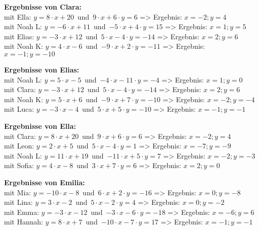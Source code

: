 \begin{minipage}{\textwidth}
\textbf{Ergebnisse von Clara:}\\
mit Ella: $y=8\cdot x+20$\mbox{ }und\mbox{ }$9\cdot x+6\cdot y=6$ => Ergebnis: $x=-2;y=4$
\\
mit Noah L: $y=-6\cdot x+11$\mbox{ }und\mbox{ }$-5\cdot x+4\cdot y=15$ => Ergebnis: $x=1;y=5$
\\
mit Elias: $y=-3\cdot x+12$\mbox{ }und\mbox{ }$5\cdot x-4\cdot y=-14$ => Ergebnis: $x=2;y=6$
\\
mit Noah K: $y=4\cdot x-6$\mbox{ }und\mbox{ }$-9\cdot x+2\cdot y=-11$ => Ergebnis: $x=-1;y=-10$
\\
\end{minipage}
\vspace*{3ex}

\begin{minipage}{\textwidth}
\textbf{Ergebnisse von Elias:}\\
mit Noah L: $y=5\cdot x-5$\mbox{ }und\mbox{ }$-4\cdot x-11\cdot y=-4$ => Ergebnis: $x=1;y=0$
\\
mit Clara: $y=-3\cdot x+12$\mbox{ }und\mbox{ }$5\cdot x-4\cdot y=-14$ => Ergebnis: $x=2;y=6$
\\
mit Noah K: $y=5\cdot x+6$\mbox{ }und\mbox{ }$-9\cdot x+7\cdot y=-10$ => Ergebnis: $x=-2;y=-4$
\\
mit Luca: $y=-3\cdot x-4$\mbox{ }und\mbox{ }$5\cdot x+5\cdot y=-10$ => Ergebnis: $x=-1;y=-1$
\\
\end{minipage}
\vspace*{3ex}

\begin{minipage}{\textwidth}
\textbf{Ergebnisse von Ella:}\\
mit Clara: $y=8\cdot x+20$\mbox{ }und\mbox{ }$9\cdot x+6\cdot y=6$ => Ergebnis: $x=-2;y=4$
\\
mit Leon: $y=2\cdot x+5$\mbox{ }und\mbox{ }$5\cdot x-4\cdot y=1$ => Ergebnis: $x=-7;y=-9$
\\
mit Noah L: $y=11\cdot x+19$\mbox{ }und\mbox{ }$-11\cdot x+5\cdot y=7$ => Ergebnis: $x=-2;y=-3$
\\
mit Sofia: $y=4\cdot x-8$\mbox{ }und\mbox{ }$3\cdot x+7\cdot y=6$ => Ergebnis: $x=2;y=0$
\\
\end{minipage}
\vspace*{3ex}

\begin{minipage}{\textwidth}
\textbf{Ergebnisse von Emilia:}\\
mit Mia: $y=-10\cdot x-8$\mbox{ }und\mbox{ }$6\cdot x+2\cdot y=-16$ => Ergebnis: $x=0;y=-8$
\\
mit Lina: $y=3\cdot x-2$\mbox{ }und\mbox{ }$5\cdot x-2\cdot y=4$ => Ergebnis: $x=0;y=-2$
\\
mit Emma: $y=-3\cdot x-12$\mbox{ }und\mbox{ }$-3\cdot x-6\cdot y=-18$ => Ergebnis: $x=-6;y=6$
\\
mit Hannah: $y=8\cdot x+7$\mbox{ }und\mbox{ }$-10\cdot x-7\cdot y=17$ => Ergebnis: $x=-1;y=-1$
\\
\end{minipage}
\vspace*{3ex}

